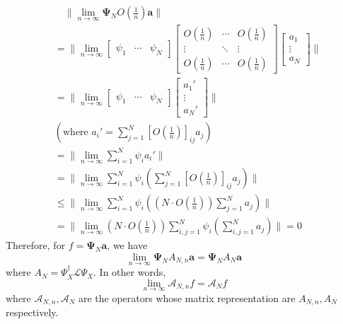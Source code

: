 \documentclass{article}[11]
\begin{document}
\begin{align*}
	&\quad \|\lim_{n\to\infty} \mathbf{\Psi}_N O(\tfrac{1}{n})\mathbf{a}\| \\
	&= \|\lim_{n\to\infty} 
	\begin{bmatrix}
		\psi_1 & \cdots & \psi_N
	\end{bmatrix}
	\begin{bmatrix}
		O(\tfrac{1}{n}) & \cdots & O(\tfrac{1}{n}) \\
		\vdots & \ddots & \vdots \\
		O(\tfrac{1}{n}) & \cdots & O(\tfrac{1}{n})
	\end{bmatrix}
	\begin{bmatrix}
		a_1 \\
		\vdots \\
		a_N
	\end{bmatrix} \| \\
	&= \|\lim_{n\to\infty} 
	\begin{bmatrix}
		\psi_1 & \cdots & \psi_N
	\end{bmatrix}
	\begin{bmatrix}
		a_1' \\
		\vdots \\
		a_N'
	\end{bmatrix} \| \\
	&(\text{where $a_i'=\sum_{j=1}^N [O(\tfrac{1}{n})]_{ij}a_j$}) \\
	&= \|\lim_{n\to\infty} \sum_{i=1}^N \psi_i a_i' \| \\
	&= \|\lim_{n\to\infty} \sum_{i=1}^N \psi_i \left( \sum_{j=1}^N [O(\tfrac{1}{n})]_{ij}a_j \right) \| \\
	&\leq \|\lim_{n\to\infty} \sum_{i=1}^N \psi_i \left( \left(N \cdot O(\tfrac{1}{n})\right) \sum_{j=1}^N a_j \right) \| \\
	&= \|\lim_{n\to\infty} \left(N \cdot O(\tfrac{1}{n})\right) \sum_{i,j=1}^N \psi_i \left( \sum_{i,j=1}^N a_j \right) \| = 0
\end{align*}
Therefore, for $f=\mathbf{\Psi}_N\mathbf{a}$, we have
$$\lim_{n\to\infty} \mathbf{\Psi}_N A_{N,n} \mathbf{a} = \mathbf{\Psi}_N A_N \mathbf{a}$$ 
where $A_N = \Psi_X^{\dagger}\mathcal{L}\Psi_X$. In other words,
$$
\lim_{n\to\infty} \mathcal{A}_{N,n} f = \mathcal{A}_N f
$$
where $\mathcal{A}_{N,n}, \mathcal{A}_N$ are the operators whose matrix representation are $A_{N,n}, A_N$ respectively.




\newpage
\end{document}
